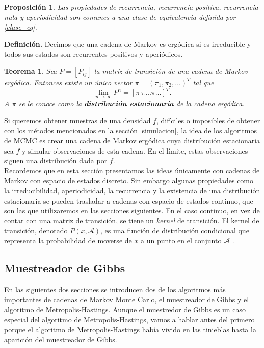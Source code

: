 \documentclass[11pt,a4paper]{article}
\newtheorem{theorem}{Teorema}[section]
\newtheorem{proposition}{Proposición}[subsection]
\begin{document}
\begin{proposition}
Las propiedades de recurrencia, recurrencia positiva, recurrencia nula y aperiodicidad son comunes a una clase de equivalencia definida por \eqref{clase_eq}.
\end{proposition}

\textbf{Definición.} Decimos que una cadena de Markov es ergódica si es irreducible y todos sus estados son recurrentes positivos y aperiódicos.

\begin{theorem}
Sea $P=[P_{ij}]$ la matriz de transición de una cadena de Markov ergódica. Entonces existe un único vector $\pi = (\pi_1, \pi_2, \dots)^T$ tal que
\begin{equation} \label{dist_limite}
\lim_{n \to \infty}P^n = [\pi \ \pi \dots \pi \dots ]^T.
\end{equation}
A $\pi$ se le conoce como la \textbf{distribución estacionaria} de la cadena ergódica.
\end{theorem}

Si queremos obtener muestras de una densidad $f$, difíciles o imposibles de obtener con los métodos mencionados en la sección \ref{simulacion}, la idea de los algoritmos de MCMC es crear una cadena de Markov ergódica cuya distribución estacionaria sea $f$ y simular observaciones de esta cadena. En el límite, estas observaciones siguen una distribución dada por $f$.\\

Recordemos que en esta sección presentamos las ideas únicamente con cadenas de Markov con espacio de estados discreto. Sin embargo algunas propiedades como la irreducibilidad, aperiodicidad, la recurrencia y la existencia de una distribución estacionaria se pueden trasladar a cadenas con espacio de estados continuo, que son las que utilizaremos en las secciones siguientes. En el caso continuo, en vez de contar con una matriz de transición, se tiene un \textit{kernel} de transición. El kernel de transición, denotado $P(x, \mathcal{A})$, es una función de distribución condicional que representa la probabilidad de moverse de $x$ a un punto en el conjunto $\mathcal{A}$ \citep{chib_mh}.\\

\subsection{Muestreador de Gibbs}
En las siguientes dos secciones se introducen dos de los algoritmos más importantes de cadenas de Markov Monte Carlo, el muestreador de Gibbs y el algoritmo de Metropolis-Hastings. Aunque el muestredor de Gibbs es un caso especial del algoritmo de Metropolis-Hastings, vamos a hablar antes del primero porque el algoritmo de Metropolis-Hastings había vivido en las tinieblas hasta la aparición del muestreador de Gibbs.\\
\end{document}
